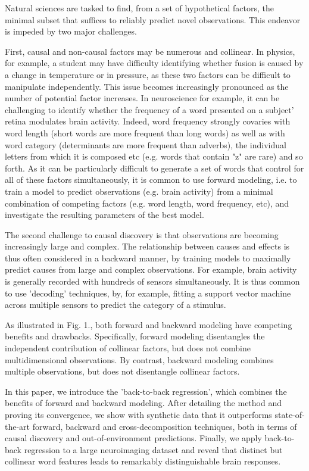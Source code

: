 
Natural sciences are tasked to find, from a set of hypothetical factors, the minimal subset that suffices to reliably predict novel observations. This endeavor is impeded by two major challenges.

First, causal and non-causal factors may be numerous and collinear. In physics, for example, a student may have difficulty identifying whether fusion is caused by a change in temperature or in pressure, as these two factors can be difficult to manipulate independently. This issue becomes increasingly pronounced as the number of potential factor increases. In neuroscience for example, it can be challenging to identify whether the frequency of a word presented on a subject' retina modulates brain activity. Indeed, word frequency strongly covaries with word length (short words are more frequent than long words) as well as with word category (determinants are more frequent than adverbs), the individual letters from which it is composed etc (e.g. words that contain "z" are rare) and so forth. As it can be particularly difficult to generate a set of words that control for all of these factors simultaneously, it is common to use forward modeling, i.e. to train a model to predict observations (e.g. brain activity) from a minimal combination of competing factors (e.g. word length, word frequency, etc), and investigate the resulting parameters of the best model.

The second challenge to causal discovery is that observations are becoming increasingly large and complex. The relationship between causes and effects is thus often considered in a backward manner, by training models to maximally predict causes from large and complex observations. For example, brain activity is generally recorded with hundreds of sensors simultaneously. It is thus common to use 'decoding' techniques, by, for example, fitting a support vector machine across multiple sensors to predict the category of a stimulus.

As illustrated in Fig. 1., both forward and backward modeling have competing benefits and drawbacks. Specifically, forward modeling disentangles the independent contribution of collinear factors, but does not combine multidimensional observations. By contrast, backward modeling combines multiple observations, but does not disentangle collinear factors. \par

In this paper, we introduce the 'back-to-back regression', which combines the benefits of forward and backward modeling. After detailing the method and proving its convergence, we show with synthetic data that it outperforms state-of-the-art forward, backward and cross-decomposition techniques, both in terms of causal discovery and out-of-environment predictions. Finally, we apply back-to-back regression to a large neuroimaging dataset and reveal that distinct but collinear word features leads to remarkably distinguishable brain responses.
